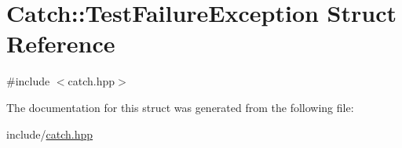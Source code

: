 \hypertarget{struct_catch_1_1_test_failure_exception}{}\section{Catch\+::Test\+Failure\+Exception Struct Reference}
\label{struct_catch_1_1_test_failure_exception}


{\ttfamily \#include $<$catch.\+hpp$>$}



The documentation for this struct was generated from the following file\+:\begin{DoxyCompactItemize}
\item 
include/\mbox{\hyperlink{catch_8hpp}{catch.\+hpp}}\end{DoxyCompactItemize}
